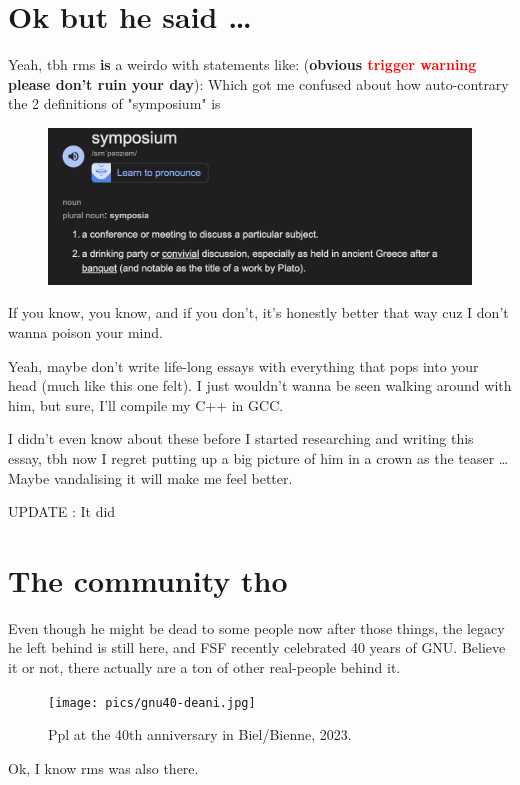 \documentclass[sigplan,screen]{acmart}
\begin{document}
\section{Ok but he said \ldots}
Yeah, tbh rms {\huge \textbf{is}} a weirdo with statements like: (\textbf{obvious \textcolor{red}{trigger warning} please don't ruin your day}): \cite{bro-wtf-1} \cite{bro-wtf-2} \cite{bro-wtf-3} \cite{bro-wtf-4} \cite{bro-wtf-5} \cite{bro-wtf-toate}
Which got me confused about how auto-contrary the 2 definitions of "symposium" is
\begin{figure}[H]
	\centering
	\includegraphics[width=\columnwidth]{pics/symposium.png}	
	\label{fig:symposium-def}
\end{figure}
If you know, you know, and if you don't, it's honestly better that way cuz I don't wanna poison your mind.

Yeah, maybe don't write life-long essays with everything that pops into your head (much like this one felt). I just wouldn't wanna be seen walking around with him, but sure, I'll compile my C++ in GCC.

I didn't even know about these before I started researching and writing this essay, tbh now I regret putting up a big picture of him in a crown as the teaser \ldots Maybe vandalising it will make me feel better.

UPDATE : It did

\section{The community tho}
Even though he might be dead to some people now after those things, the legacy he left behind is still here, and FSF recently celebrated 40 years of GNU. Believe it or not, there actually are a ton of other real-people behind it. \cite{gnu-forty-years}
\begin{figure}[H]
	\texttt{[image: pics/gnu40-deani.jpg]}	
	\caption{Ppl at the 40th anniversary in Biel/Bienne, 2023.}
	\label{fig:gnu-anniversary}	
\end{figure}
Ok, I know rms was also there. \cite{gnu-forty-years-stallman}
\end{document}

